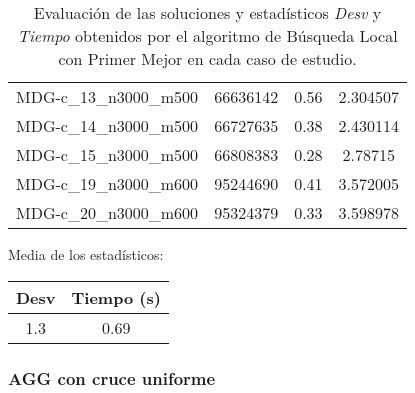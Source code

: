 \documentclass{article}
\begin{document}
\begin{table}[H]
\begin{tabular}{|cccc|}
		MDG-c\_13\_n3000\_m500 & 66636142 & 0.56 & 2.304507\\
		MDG-c\_14\_n3000\_m500 & 66727635 & 0.38 & 2.430114\\
		MDG-c\_15\_n3000\_m500 & 66808383 & 0.28 & 2.78715\\
		MDG-c\_19\_n3000\_m600 & 95244690 & 0.41 & 3.572005\\
		MDG-c\_20\_n3000\_m600 & 95324379 & 0.33 & 3.598978\\
		\hline
	\end{tabular}
	\caption{Evaluación de las soluciones y estadísticos \emph{Desv} y \emph{Tiempo} obtenidos por el algoritmo de Búsqueda Local
		con Primer Mejor en cada caso de estudio.}
	\label{tab:bs-primer-mejor}
\end{table}

Media de los estadísticos:
\begin{table}[H]
	\centering
	\begin{tabular}{|cc|}
		\hline
		Desv & Tiempo (s)\\ \hline
		1.3 & 0.69 \\
		\hline
	\end{tabular}
\end{table}

\subsubsection*{AGG con cruce uniforme}
\end{document}
